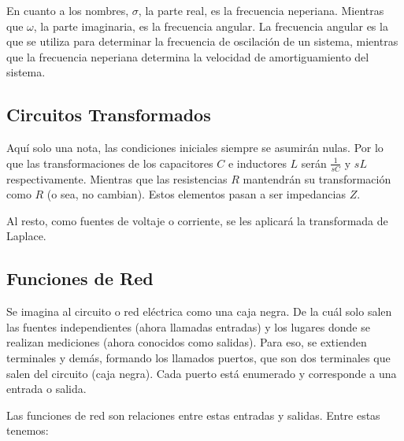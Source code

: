 \documentclass[12pt,letterpaper]{article}
\begin{document}
En cuanto a los nombres, $\sigma$, la parte real, es la frecuencia neperiana. Mientras que $\omega$, la parte imaginaria, es la frecuencia angular. La frecuencia angular es la que se utiliza para determinar la frecuencia de oscilación de un sistema, mientras que la frecuencia neperiana determina la velocidad de amortiguamiento del sistema.

\subsection{Circuitos Transformados}

Aquí solo una nota, las condiciones iniciales siempre se asumirán nulas. Por lo que las transformaciones de los capacitores $C$ e inductores $L$ serán $\frac{1}{sC}$ y $sL$ respectivamente. Mientras que las resistencias $R$ mantendrán su transformación como $R$ (o sea, no cambian). Estos elementos pasan a ser impedancias $Z$.

Al resto, como fuentes de voltaje o corriente, se les aplicará la transformada de Laplace. 

\subsection{Funciones de Red}

Se imagina al circuito o red eléctrica como una caja negra. De la cuál solo salen las fuentes independientes (ahora llamadas entradas) y los lugares donde se realizan mediciones (ahora conocidos como salidas). Para eso, se extienden terminales y demás, formando los llamados puertos, que son dos terminales que salen del circuito (caja negra). Cada puerto está enumerado y corresponde a una entrada o salida.

Las funciones de red son relaciones entre estas entradas y salidas. Entre estas tenemos:
\end{document}
